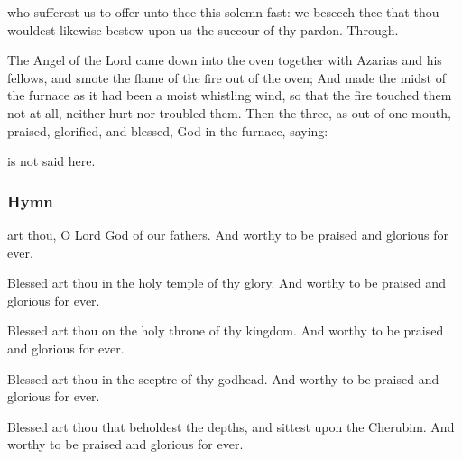 \collect

\vspace{-0.2\baselineskip}

 who sufferest us to offer unto thee this solemn fast: we beseech thee that thou wouldest likewise bestow upon us the succour of thy pardon. Through.

\vspace{-0.4\baselineskip}


\vspace{-0.2\baselineskip}

 The Angel of the Lord came down into the oven together with Azarias and his fellows, and smote the flame of the fire out of the oven; And made the midst of the furnace as it had been a moist whistling wind, so that the fire touched them not at all, neither hurt nor troubled them. Then the three, as out of one mouth, praised, glorified, and blessed, God in the furnace, saying:

\begin{rubric}
     is not said here.
\end{rubric}

\vspace{-0.2\baselineskip}

\subsubsection{Hymn}

\vspace{-0.1\baselineskip}

 art thou, O Lord God of our fathers. And worthy to be praised and glorious for ever.


Blessed art thou in the holy temple of thy glory. And worthy to be praised and glorious for ever.

Blessed art thou on the holy throne of thy kingdom. And worthy to be praised and glorious for ever.

Blessed art thou in the sceptre of thy godhead. And worthy to be praised and glorious for ever.

Blessed art thou that beholdest the depths, and sittest upon the Cherubim. And worthy to be praised and glorious for ever.

